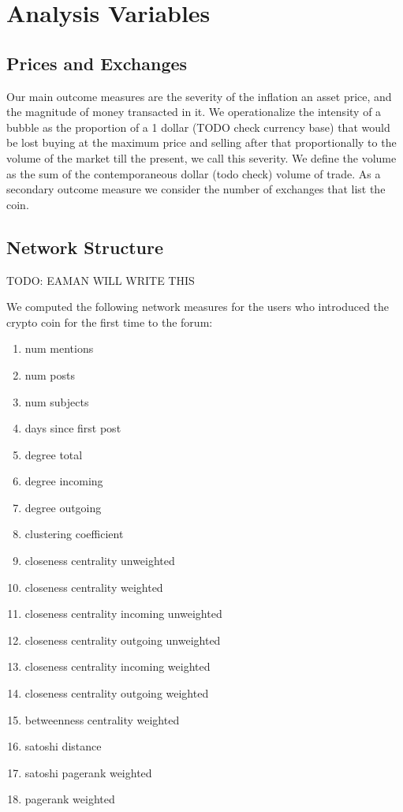 \section{Analysis Variables}
\subsection{Prices and Exchanges}
Our main outcome measures are the severity of the inflation an asset price, and the magnitude of money transacted in it.
We operationalize the intensity of a bubble as the proportion of a 1 dollar (TODO check currency base) that would be lost buying at the maximum price and selling after that proportionally to the volume of the market till the present, we call this severity.
We define the volume as the sum of the contemporaneous dollar (todo check) volume of trade.
As a secondary outcome measure we consider the number of exchanges that list the coin.


\subsection{Network Structure}
TODO: EAMAN WILL WRITE THIS


We computed the following network measures for the users who introduced the
crypto coin for the first time to the forum:
\begin{enumerate}
  \item{num mentions}
  \item{num posts}
  \item{num subjects}
  \item{days since first post}
  \item{degree total}
  \item{degree incoming}
  \item{degree outgoing}
  \item{clustering coefficient}
  \item{closeness centrality unweighted}
  \item{closeness centrality weighted}
  \item{closeness centrality incoming unweighted}
  \item{closeness centrality outgoing unweighted}
  \item{closeness centrality incoming weighted}
  \item{closeness centrality outgoing weighted}
  \item{betweenness centrality weighted}
  \item{satoshi distance}
  \item{satoshi pagerank weighted}
  \item{pagerank weighted}
\end{enumerate}
